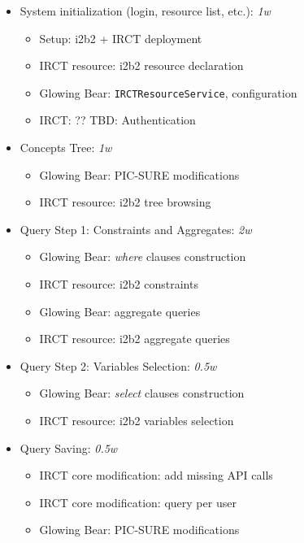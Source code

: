 \begin{itemize}
    \item System initialization (login, resource list, etc.): \emph{1w}
    \begin{itemize}
        \item Setup: i2b2 + IRCT deployment
        \item IRCT resource: i2b2 resource declaration
        \item Glowing Bear: \verb|IRCTResourceService|, configuration
        \item IRCT: ??  TBD: Authentication %
    \end{itemize}
    
    \item Concepts Tree: \emph{1w}
    \begin{itemize}
        \item Glowing Bear: PIC-SURE modifications
        \item IRCT resource: i2b2 tree browsing
    \end{itemize}
    
    \item Query Step 1: Constraints and Aggregates: \emph{2w}
    \begin{itemize}
        \item Glowing Bear: \emph{where} clauses construction
        \item IRCT resource: i2b2 constraints
        \item Glowing Bear: aggregate queries
        \item IRCT resource: i2b2 aggregate queries
    \end{itemize}
    
    \item Query Step 2: Variables Selection: \emph{0.5w}
    \begin{itemize}
        \item Glowing Bear: \emph{select} clauses construction
        \item IRCT resource: i2b2 variables selection
    \end{itemize}
    
    \item Query Saving: \emph{0.5w}
    \begin{itemize}
        \item IRCT core modification: add missing API calls
        \item IRCT core modification: query per user
        \item Glowing Bear: PIC-SURE modifications
    \end{itemize}
    

\end{itemize}
